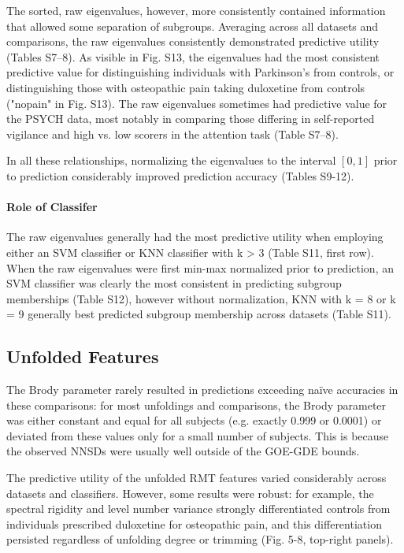 The sorted, raw eigenvalues, however, more consistently contained information that allowed some
separation of subgroups. Averaging across all datasets and comparisons, the raw eigenvalues
consistently demonstrated predictive utility (Tables S7--8). As visible in Fig. S13, the eigenvalues
had the most consistent predictive value for distinguishing individuals with Parkinson's from
controls, or distinguishing those with osteopathic pain taking duloxetine from controls ("nopain" in
Fig. S13). The raw eigenvalues sometimes had predictive value for the PSYCH data, most notably in
comparing those differing in self-reported vigilance and high vs. low scorers in the attention task
(Table S7--8).

In all these relationships, normalizing the eigenvalues to the interval \([0,1]\) prior to
prediction considerably improved prediction accuracy (Tables S9-12).

\paragraph{Role of Classifer}
The raw eigenvalues generally had the most predictive utility when employing either an SVM
classifier or KNN classifier with k > 3 (Table S11, first row). When the raw eigenvalues were first
min-max normalized prior to prediction, an SVM classifier was clearly the most consistent in
predicting subgroup memberships (Table S12), however without normalization, KNN with k = 8 or k = 9
generally best predicted subgroup membership across datasets (Table S11).

\subsection{Unfolded Features}
The Brody parameter rarely resulted in predictions exceeding naïve accuracies in these comparisons:
for most unfoldings and comparisons, the Brody parameter was either constant and equal for all
subjects (e.g. exactly 0.999 or 0.0001) or deviated from these values only for a small number of
subjects. This is because the observed NNSDs were usually well outside of the GOE-GDE bounds.

The predictive utility of the unfolded RMT features varied considerably across datasets and
classifiers. However, some results were robust: for example, the spectral rigidity and level number
variance strongly differentiated controls from individuals prescribed duloxetine for osteopathic
pain, and this differentiation persisted regardless of unfolding degree or trimming (Fig. 5-8, top-right panels).

